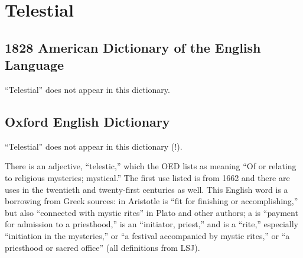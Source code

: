 \section{Telestial}
	\label{TELESTIAL}
	

\subsection{1828 American Dictionary of the English Language} %
	\label{TELESTIAL-1828}

	``Telestial'' does not appear in this dictionary.

\subsection{Oxford English Dictionary} %
	\label{TELESTIAL-OED}

	``Telestial'' does not appear in this dictionary (!).
	
	There is an adjective, ``telestic,'' which the OED lists as meaning ``Of or relating to religious mysteries; mystical.'' The first use listed is from 1662 and there are uses in the twentieth and twenty-first centuries as well. This English word is a borrowing from Greek sources:  in Aristotle is ``fit for finishing or accomplishing,'' but also ``connected with mystic rites'' in Plato and other authors; a  is ``payment for admission to a priesthood,''  is an ``initiator, priest,'' and  is a ``rite,'' especially ``initiation in the mysteries,'' or ``a festival accompanied by mystic rites,'' or ``a priesthood or sacred office'' (all definitions from LSJ).


	
